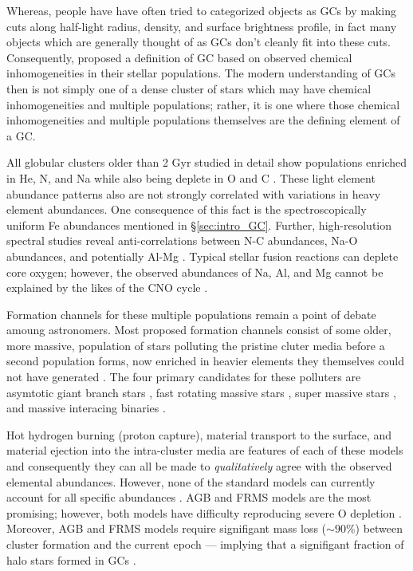 Whereas, people have have often tried to categorized objects as GCs by making
cuts along half-light radius, density, and surface brightness profile, in fact
many objects which are generally thought of as GCs don't cleanly fit into these
cuts. Consequently, \citet{Carretta2010} proposed a definition of GC based on
observed chemical inhomogeneities in their stellar populations. The modern
understanding of GCs then is not simply one of a dense cluster of stars which
may have chemical inhomogeneities and multiple populations; rather, it is one
where those chemical inhomogeneities and multiple populations themselves are
the defining element of a GC.

All globular clusters older than 2 Gyr studied in detail show populations
enriched in He, N, and Na while also being deplete in O and C
\citep{Piotto2015,Bastian2018}. These light element abundance patterns also are
not strongly correlated with variations in heavy element abundances. One
consequence of this fact is the spectroscopically uniform Fe abundances
mentioned in \S\ref{sec:intro_GC}. Further, high-resolution spectral studies
reveal anti-correlations between N-C abundances, Na-O abundances, and
potentially Al-Mg \citep{Sneden1992, Gratton2012}. Typical stellar fusion
reactions can deplete core oxygen; however, the observed abundances of Na, Al,
and Mg cannot be explained by the likes of the CNO cycle \citep{Prantzos2007}.

Formation channels for these multiple populations remain a point of debate
amoung astronomers. Most proposed formation channels consist of some older,
more massive, population of stars polluting the pristine cluter media before a
second population forms, now enriched in heavier elements they themselves could
not have generated \citep[for a detailed review see ][]{Gratton2012}. The four
primary candidates for these polluters are asymtotic giant branch stars
\citep[AGBs,][]{Ventura2001,DErcole2010}, fast rotating massive stars
\citep[FRMSs,][]{Decressin2007}, super massive stars
\citep[SMSs,][]{Denissenkov2014}, and massive interacing binaries
\citep[MIBs,][]{deMink2009, Bastian2018}. 

Hot hydrogen burning (proton capture), material transport to the surface, and
material ejection into the intra-cluster media are features of each of these
models and consequently they can all be made to {\it qualitatively} agree with
the observed elemental abundances. However, none of the standard models can
currently account for all specific abundances \citep{Gratton2012}. AGB and FRMS
models are the most promising; however, both models have difficulty reproducing
severe O depletion \citep{Ventura2009,Decressin2007}. Moreover, AGB and FRMS
models require signifigant mass loss ($\sim 90\%$) between cluster formation
and the current epoch --- implying that a signifigant fraction of halo stars
formed in GCs \citep{Renzini2008,DErcole2008,Bastian2015}.

